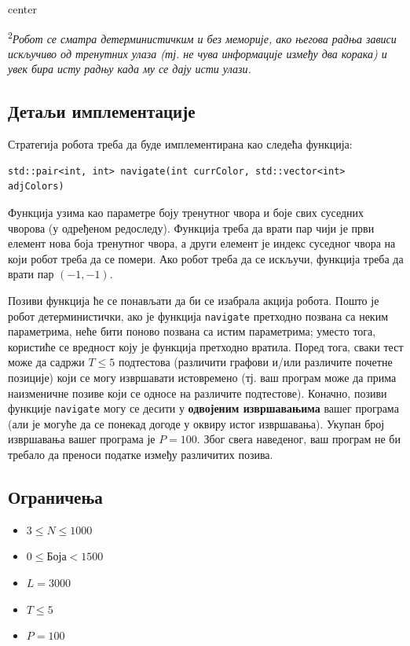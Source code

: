 \documentclass[12pt]{article}
\begin{document}
\begin{adjustbox}{center}

\end{adjustbox}

\textsuperscript{2}\textit{Робот се сматра детерминистичким и без меморије, ако његова радња зависи искључиво од тренутних улаза (тј. не чува информације између два корака) и увек бира исту радњу када му се дају исти улази.}

\subsection{Детаљи имплементације}
Стратегија робота треба да буде имплементирана као следећа функција:
\begin{lstlisting}
std::pair<int, int> navigate(int currColor, std::vector<int> adjColors)
\end{lstlisting}

Функција узима као параметре боју тренутног чвора и боје свих суседних чворова (у одређеном редоследу). Функција треба да врати пар чији је први елемент нова боја тренутног чвора, а други елемент је индекс суседног чвора на који робот треба да се помери. Ако робот треба да се искључи, функција треба да врати пар $(-1, -1)$.

Позиви функција ће се понављати да би се изабрала акција робота. Пошто је робот детерминистички, ако је функција \texttt{navigate} претходно позвана са неким параметрима, неће бити поново позвана са истим параметрима; уместо тога, користиће се вредност коју је функција претходно вратила. Поред тога, сваки тест може да садржи $T \leq 5$ подтестова (различити графови и/или различите почетне позиције) који се могу извршавати истовремено (тј. ваш програм може да прима наизменичне позиве који се односе на различите подтестове). Коначно, позиви функције \texttt{navigate} могу се десити у \textbf{одвојеним извршавањима} вашег програма (али је могуће да се понекад догоде у оквиру истог извршавања). Укупан број извршавања вашег програма је $P = 100$. Због свега наведеног, ваш програм не би требало да преноси податке између различитих позива.

\subsection{Ограничења}

\begin{itemize}
\item $3 \leq N \leq 1000$
\item $0 \leq \mathrm{Боја} < 1500$
\item $L = 3000$
\item $T \leq 5$
\item $P = 100$
\end{itemize}
\end{document}
